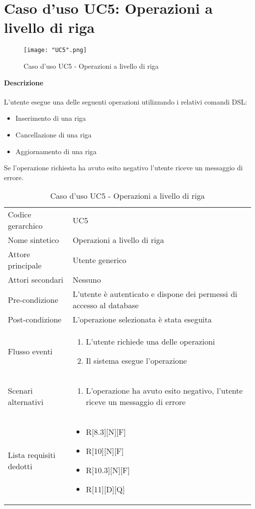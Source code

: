 \documentclass[a4paper]{report}
\begin{document}
	 \section{Caso d'uso UC5: Operazioni a livello di riga}
	 \begin{figure}[H]
			\centering
			\texttt{[image: "UC5".png]}
			\caption{Caso d'uso UC5 - Operazioni a livello di riga}
		\end{figure}
	 \textbf{Descrizione} \\ \\
	 L'utente esegue una delle seguenti operazioni utilizzando i relativi comandi DSL:
	 \begin{itemize}
	 	\item Inserimento di una riga
	 	\item Cancellazione di una riga
	 	\item Aggiornamento di una riga
	 \end{itemize}
	 Se l'operazione richiesta ha avuto esito negativo l'utente riceve un messaggio di errore.
		\begin{table}[H]
		\begin{tabularx}{\textwidth}{X | X}\toprule
			\rowcolor{orange!65}Codice gerarchico & UC5\\
			Nome sintetico & Operazioni a livello di riga\\
			\rowcolor{orange!65}Attore principale & Utente generico\\
			Attori secondari & Nessuno \\
			\rowcolor{orange!65}Pre-condizione & L'utente è autenticato e dispone dei permessi di accesso
			al database\\
			Post-condizione & L'operazione selezionata è stata eseguita\\
			\rowcolor{orange!65}Flusso eventi & \begin{enumerate}
			\item L'utente richiede una delle operazioni
			\item Il sistema esegue l'operazione
			\end{enumerate} \\
			Scenari alternativi & \begin{enumerate}
			\item L'operazione ha avuto esito negativo, l'utente riceve un messaggio di errore
			\end{enumerate} \\
			\rowcolor{orange!65}Lista requisiti dedotti & \begin{itemize}
				\item R[8.3][N][F]
				\item R[10][N][F]
				\item R[10.3][N][F]
				\item R[11][D][Q]
				\end{itemize} \\
			\bottomrule
		\end{tabularx}
		\caption{Caso d'uso UC5 - Operazioni a livello di riga}
	 \end{table}
\end{document}
